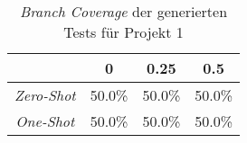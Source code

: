 \bgroup
\def\arraystretch{2}
\begin{table}[H]
	\vspace{.5cm}
	\centering		
	\begin{center}
		\begin{tabular}{|c||c|c|c|}
			\hline 
			& 0 & 0.25 & 0.5 \\
			\hline 
			\hline
			\textit{Zero-Shot} & 50.0\% & 50.0\% & 50.0\% \\
			\hline
			\textit{One-Shot} & 50.0\% & 50.0\% & 50.0\% \\
			\hline
		\end{tabular} 
	\end{center}
	\caption{\textit{Branch Coverage} der generierten Tests für Projekt 1}
	\label{fig:branch-1}
	\vspace{-.8cm}
\end{table}
\egroup